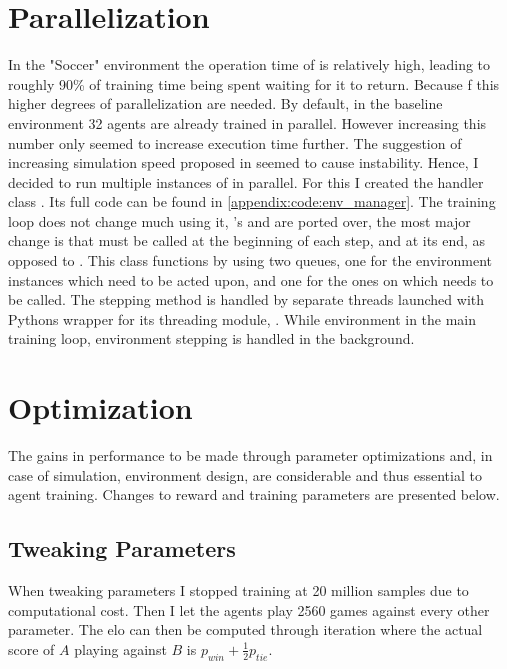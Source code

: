 \section{Parallelization}\label{sec:tr:parallel}
In the "Soccer" environment the operation time of  is relatively high, leading to roughly 90\% of training time being spent waiting for it to return. Because f this higher degrees of parallelization  are needed. By default, in the baseline environment 32 agents are already trained in parallel. However increasing this number only seemed to increase execution time further. The suggestion of increasing simulation speed proposed in \cite{noauthor_unity-technologiesml-agents_2020} seemed to cause instability. Hence, I decided to run multiple instances of  in parallel. For this I created the handler class . Its full code can be found in \ref{appendix:code:env_manager}. The training loop does not change much using it, 's  and  are ported over, the most major change is that  must be called at the beginning of each step, and  at its end, as opposed to . This class functions by using two queues, one for the environment instances which need to be acted upon, and one for the ones on which  needs to be called. The stepping method is handled by separate threads launched with Pythons wrapper for its threading module, . While environment in the main training loop, environment stepping is handled in the background. 


\section{Optimization}\label{sec:tr:param_tweaking}
The gains in performance to be made through parameter optimizations and, in case of simulation, environment design, are considerable and thus essential to agent training. Changes to reward and training parameters are presented below.

\subsection{Tweaking Parameters}\label{subsec:tr:opt_alg:parameters}
When tweaking parameters I stopped training at 20 million samples due to computational cost. Then I let the agents play 2560 games against every other parameter. The elo can then be computed through iteration where the actual score of $A$ playing against $B$ is $p_{win} + \frac{1}{2}p_{tie}$.

